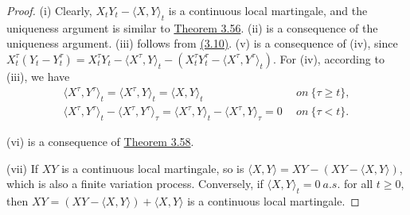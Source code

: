 \documentclass{article}
\numberwithin{equation}{section}
\theoremstyle{plain}
\theoremstyle{definition}
\begin{document}
\begin{proof}
(i) Clearly, $X_tY_t-\langle X,Y\rangle_t$ is a continuous local martingale, and the uniqueness argument is similar to \hyperref[thm:3.56]{Theorem 3.56}. (ii) is a consequence of the uniqueness argument. (iii) follows from \hyperref[eq:3.10]{(3.10)}. (v) is a consequence of (iv), since $X_t^\tau(Y_t-Y_t^\tau) = X_t^\tau Y_t - \langle X^\tau,Y\rangle_t - (X_t^\tau Y_t^\tau - \langle X^\tau, Y^\tau\rangle_t)$. For (iv), according to (iii), we have
\begin{align*}
	\langle X^\tau,Y^\tau\rangle_t = \langle X^\tau,Y\rangle_t = \langle X,Y\rangle_t\ &\textit{on}\ \{\tau\geq t\},\\
	\langle X^\tau,Y^\tau\rangle_t - \langle X^\tau,Y^\tau\rangle_\tau = \langle X^\tau,Y\rangle_t - \langle X^\tau,Y\rangle_\tau=0\ \ &\textit{on}\ \{\tau<t\}.
\end{align*}

(vi) is a consequence of \hyperref[thm:3.58]{Theorem 3.58}. 

(vii) If $XY$ is a continuous local martingale, so is $\langle X,Y\rangle=XY-\left(XY-\langle X,Y\rangle\right)$, which is also a finite variation process. Conversely, if $\langle X,Y\rangle_t=0\ a.s.$ for all $t\geq 0$, then $XY = (XY - \langle X,Y\rangle)+\langle X,Y\rangle$ is a continuous local martingale.
\end{proof}
\end{document}
